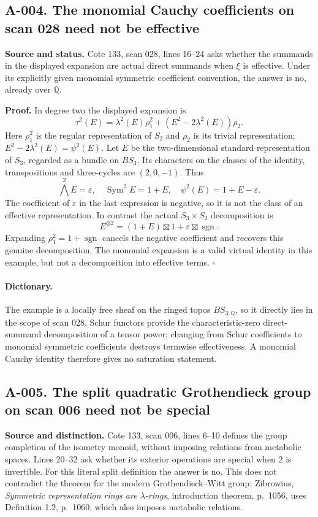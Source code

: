 \subsection*{A-004. The monomial Cauchy coefficients on scan 028 need not be effective}
\textbf{Source and status.} Cote 133, scan 028, lines 16--24 asks whether
the summands in the displayed expansion are actual direct summands when
$\xi$ is effective.  Under its explicitly given monomial symmetric
coefficient convention, the answer is no, already over $\mathbb Q$.

\textbf{Proof.} In degree two the displayed expansion is
\[
 \tau^2(E)=\lambda^2(E)\rho_1^2+
             (E^2-2\lambda^2(E))\rho_2.
\]
Here $\rho_1^2$ is the regular representation of $S_2$ and $\rho_2$ is its
trivial representation; $E^2-2\lambda^2(E)=\psi^2(E)$.
Let $E$ be the two-dimensional standard representation of $S_3$, regarded
as a bundle on $BS_3$.  Its characters on the classes of the identity,
transpositions and three-cycles are $(2,0,-1)$.  Thus
\[
 \bigwedge^2E=\varepsilon,\quad
 \operatorname{Sym}^2E=1+E,\quad
 \psi^2(E)=1+E-\varepsilon.
\]
The coefficient of $\varepsilon$ in the last expression is negative, so it
is not the class of an effective representation.  In contrast the actual
$S_3\times S_2$ decomposition is
\[
 E^{\otimes2}=(1+E)\boxtimes1+\varepsilon\boxtimes\operatorname{sgn}.
\]
Expanding $\rho_1^2=1+\operatorname{sgn}$ cancels the negative coefficient
and recovers this genuine decomposition.  The monomial expansion is a
valid virtual identity in this example, but not a decomposition into
effective terms. \hfill$\square$

\paragraph{Dictionary.}
The example is a locally free sheaf on the ringed topos $BS_{3,\mathbb Q}$,
so it directly lies in the scope of scan 028.  Schur functors provide the
characteristic-zero direct-summand decomposition of a tensor power; changing
from Schur coefficients to monomial symmetric coefficients destroys
termwise effectiveness.  A monomial Cauchy identity therefore gives no
saturation statement.

\subsection*{A-005. The split quadratic Grothendieck group on scan 006 need not be special}
\textbf{Source and distinction.} Cote 133, scan 006, lines 6--10 defines
the group completion of the isometry monoid, without imposing relations
from metabolic spaces.  Lines 20--32 ask whether its exterior operations
are special when $2$ is invertible.  For this literal split definition the
answer is no.  This does not contradict the theorem for the modern
Grothendieck--Witt group: Zibrowius, \emph{Symmetric representation rings
are $\lambda$-rings}, introduction theorem, p.~1056, uses Definition 1.2,
p.~1060, which also imposes metabolic relations.

